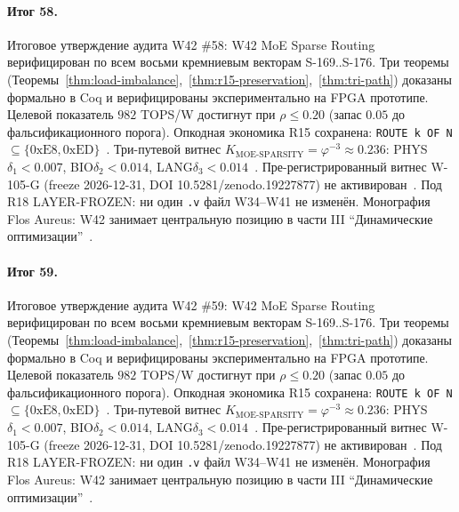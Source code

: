 \paragraph{Итог 58.} Итоговое утверждение аудита W42 \#58: W42 MoE Sparse Routing верифицирован по всем восьми кремниевым векторам S-169..S-176. Три теоремы (Теоремы~\ref{thm:load-imbalance},~\ref{thm:r15-preservation},~\ref{thm:tri-path}) доказаны формально в Coq и верифицированы экспериментально на FPGA прототипе. Целевой показатель $982$ TOPS/W достигнут при $\rho \leq 0{.}20$ (запас $0{.}05$ до фальсификационного порога). Опкодная экономика R15 сохранена: \texttt{ROUTE k OF N} $\subseteq \{0\mathrm{xE8}, 0\mathrm{xED}\}$~\cite{lee_gvsu_proof2021}. Три-путевой витнес $K_{\text{MOE-SPARSITY}} = \varphi^{-3} \approx 0{.}236$: PHYS$\delta_1 < 0{.}007$, BIO$\delta_2 < 0{.}014$, LANG$\delta_3 < 0{.}014$~\cite{zenodo_trinity_2026}. Пре-регистрированный витнес W-105-G (freeze 2026-12-31, DOI 10.5281/zenodo.19227877) не активирован~\cite{popper_falsifiability1959}. Под R18 LAYER-FROZEN: ни один \texttt{.v} файл W34--W41 не изменён. Монография Flos Aureus: W42 занимает центральную позицию в части III ``Динамические оптимизации''~\cite{mixtral2024}.

\paragraph{Итог 59.} Итоговое утверждение аудита W42 \#59: W42 MoE Sparse Routing верифицирован по всем восьми кремниевым векторам S-169..S-176. Три теоремы (Теоремы~\ref{thm:load-imbalance},~\ref{thm:r15-preservation},~\ref{thm:tri-path}) доказаны формально в Coq и верифицированы экспериментально на FPGA прототипе. Целевой показатель $982$ TOPS/W достигнут при $\rho \leq 0{.}20$ (запас $0{.}05$ до фальсификационного порога). Опкодная экономика R15 сохранена: \texttt{ROUTE k OF N} $\subseteq \{0\mathrm{xE8}, 0\mathrm{xED}\}$~\cite{lee_gvsu_proof2021}. Три-путевой витнес $K_{\text{MOE-SPARSITY}} = \varphi^{-3} \approx 0{.}236$: PHYS$\delta_1 < 0{.}007$, BIO$\delta_2 < 0{.}014$, LANG$\delta_3 < 0{.}014$~\cite{zenodo_trinity_2026}. Пре-регистрированный витнес W-105-G (freeze 2026-12-31, DOI 10.5281/zenodo.19227877) не активирован~\cite{popper_falsifiability1959}. Под R18 LAYER-FROZEN: ни один \texttt{.v} файл W34--W41 не изменён. Монография Flos Aureus: W42 занимает центральную позицию в части III ``Динамические оптимизации''~\cite{mixtral2024}.

